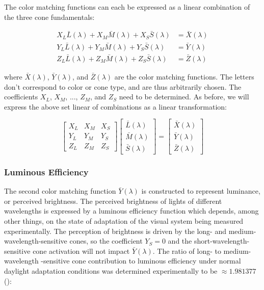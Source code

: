 \documentclass{article}
\begin{document}
\begin{multicols}{2}
The color matching functions can each be expressed as a linear combination of the three cone fundamentals:

\begin{equation} %
    \begin{aligned}
        X_L\bar{L}(\lambda)+X_M\bar{M}(\lambda)+X_S\bar{S}(\lambda)&=\bar{X}(\lambda)\\
        Y_L\bar{L}(\lambda)+Y_M\bar{M}(\lambda)+Y_S\bar{S}(\lambda)&=\bar{Y}(\lambda)\\
        Z_L\bar{L}(\lambda)+Z_M\bar{M}(\lambda)+Z_S\bar{S}(\lambda)&=\bar{Z}(\lambda)
    \end{aligned}
\end{equation}

where $\bar{X}(\lambda)$, $\bar{Y}(\lambda)$, and $\bar{Z}(\lambda)$ are the color matching functions.  The letters don't correspond to color or cone type, and are thus arbitrarily chosen.  The coefficients $X_L$, $X_M$, ..., $Z_M$, and $Z_S$ need to be determined.  As before, we will express the above set linear of combinations as a linear transformation:

\begin{equation} %
    \begin{bmatrix}
        X_L&X_M&X_S\\
        Y_L&Y_M&Y_S\\
        Z_L&Z_M&Z_S
    \end{bmatrix}\begin{bmatrix}
        \bar{L}(\lambda)\\
        \bar{M}(\lambda)\\
        \bar{S}(\lambda)
    \end{bmatrix}=\begin{bmatrix}
        \bar{X}(\lambda)\\
        \bar{Y}(\lambda)\\
        \bar{Z}(\lambda)
    \end{bmatrix}
\end{equation}

\subsubsection{Luminous Efficiency} %

The second color matching function $\bar{Y}(\lambda)$ is constructed to represent luminance, or perceived brightness.  The perceived brightness of lights of different wavelengths is expressed by a luminous efficiency function which depends, among other things, on the state of adaptation of the visual system being measured experimentally.  The perception of brightness is driven by the long- and medium-wavelength-sensitive cones, so the coefficient $Y_S=0$ and the short-wavelength-sensitive cone activation will not impact $\bar{Y}(\lambda)$.  The ratio of long- to medium-wavelength -sensitive cone contribution to luminous efficiency under normal daylight adaptation conditions was determined experimentally to be $\approx1.981377$ (\cite{sharpe2011luminous}):


\end{multicols}
\end{document}
